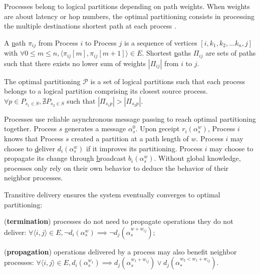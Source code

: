 Processes belong to logical partitions depending on path weights. When
weights are about latency or hop numbers, the optimal partitioning
consists in processing the multiple destinations shortest path at each
process \REF.

\begin{definition}
  A \underline{p}ath $\pi_{ij}$ from Process $i$ to Process $j$ is a
  sequence of vertices $[i, k_1, k_2, \ldots k_n, j]$ with $\forall
  0\leq m \leq n, \langle \pi_{ij}[m], \pi_{ij}[m+1] \rangle \in
  E$. Shortest \underline{p}aths $\Pi_{ij}$ are sets of paths such
  that there exists no lower sum of weights $|\Pi_{ij}|$ from $i$ to
  $j$.
\end{definition}

\begin{definition}
  The optimal partitioning $\mathcal{P}$ is a set of logical
  partitions such that each process belongs to a logical partition
  comprising its closest source process.  $\forall p \in P_{s_1\in S},
  \nexists P_{s_2 \in S}$ such that $|\Pi_{s_1p}| > |\Pi_{s_2p}|$.
\end{definition}

Processes use reliable asynchronous message passing to reach optimal
partitioning together. Process $s$ generates a message
$\alpha_s^0$. Upon \underline{r}eceipt $r_i(\alpha_s^{w})$, Process
$i$ knows that Process $s$ created a partition at a path length of
$w$. Process $i$ may choose to \underline{d}eliver $d_i(\alpha_s^{w})$
if it improves its partitioning. Process $i$ may choose to propagate
its change through \underline{b}roadcast $b_i(\alpha_s^w)$.  Without
global knowledge, processes only rely on their own behavior to deduce
the behavior of their neighbor processes.


\begin{definition}
  Transitive delivery ensures the system eventually converges to
  optimal partitioning:
  \begin{inparaenum}[(i)]
  \item (\textbf{termination}) processes do not need to propagate
    operations they do not deliver: $\forall \langle i, j \rangle \in
    E, \neg d_i(\alpha_{s}^w)\implies \neg
    d_j(\alpha_{s}^{w+w_{ij}})$;
  \item (\textbf{propagation}) operations delivered by a process may
    also benefit neighbor processes: $\forall \langle i, j \rangle \in
    E, d_i(\alpha_{s}^{w_1}) \implies
    d_j(\alpha_{s}^{w_1+w_{ij}}) \vee
    d_j(\alpha_{*}^{w_2 < w_1 + w_{ij}})$.
  \end{inparaenum}
\end{definition}


